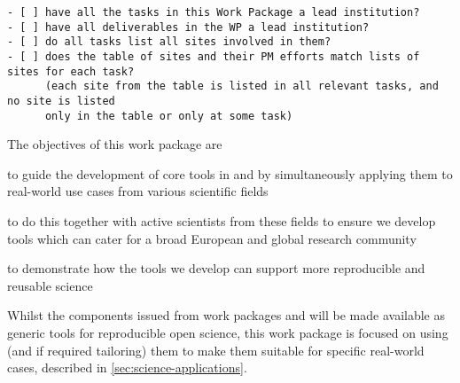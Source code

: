 \begin{draft}
\begin{verbatim}
- [ ] have all the tasks in this Work Package a lead institution?
- [ ] have all deliverables in the WP a lead institution?
- [ ] do all tasks list all sites involved in them?
- [ ] does the table of sites and their PM efforts match lists of sites for each task?
      (each site from the table is listed in all relevant tasks, and no site is listed
      only in the table or only at some task)
\end{verbatim}
\end{draft}

\begin{workpackage}[
  id=applications,
  wphases={6-36!.48,12-24!0.62,24-30!0.95,30-36!1.14},
  swsites,
  title=Applications and use cases,
  short=Applications,
  lead=MP,
  MPRM=15,
  SRLRM=3,
  UIORM=8,
  IFRRM=14
]

\begin{wpobjectives}
  The objectives of this work package are
 \begin{compactitem}
 \item to guide the development of core tools in  and 
   by simultaneously applying them to real-world use cases from various scientific fields
 \item to do this together with active scientists from these fields to ensure we develop tools
   which can cater for a broad European and global research community
 \item to demonstrate how the tools we develop can support more reproducible and
   reusable science
   \end{compactitem}
\end{wpobjectives}

\begin{wpdescription}

  Whilst the components issued from work packages   and  will be
  made available as generic tools for reproducible open science,
  this work package is focused on using (and if required tailoring) them
  to make them suitable for specific real-world cases, described in \ref{sec:science-applications}.


\end{wpdescription}
\end{workpackage}
